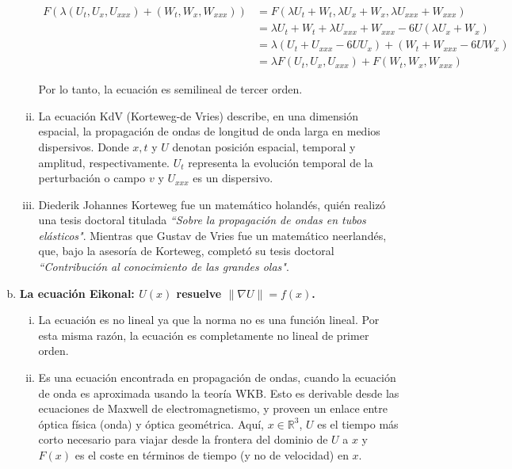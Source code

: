 \documentclass[fleqn]{article}
\newcommand{\real}{\mathbb{R}}
\begin{document}
\begin{enumerate}[(a)]
\begin{enumerate}[(i)]
			\begin{align*}
				F(\lambda (U_t, U_x, U_{xxx}) + (W_t, W_x, W_{xxx})) &= F(\lambda U_t + W_t, \lambda U_x + W_x, \lambda U_{xxx} + W_{xxx}) \\
				&= \lambda U_t + W_t + \lambda U_{xxx} + W_{xxx} - 6U(\lambda U_x + W_x) \\
				&= \lambda (U_t + U_{xxx} - 6UU_x) + (W_t + W_{xxx} - 6UW_x) \\
				&= \lambda F(U_t, U_x, U_{xxx}) + F(W_t, W_x, W_{xxx})
			\end{align*}

			Por lo tanto, la ecuación es semilineal de tercer orden.
			
			\item La ecuación KdV (Korteweg-de Vries) describe, en una dimensión espacial, la propagación de ondas de longitud de onda larga en medios dispersivos. Donde $ x, t $ y $ U $ denotan posición espacial, temporal y amplitud, respectivamente. $ U_t $ representa la evolución temporal de la perturbación o campo $ v $ y $ U_{xxx} $ es un dispersivo.
			
			\item Diederik Johannes Korteweg fue un matemático holandés, quién realizó una tesis doctoral titulada \textit{``Sobre la propagación de ondas en tubos elásticos"}. Mientras que Gustav de Vries fue un matemático neerlandés, que, bajo la asesoría de Korteweg, completó su tesis doctoral \textit{``Contribución al conocimiento de las grandes olas"}.
		\end{enumerate}

		\item \textbf{La ecuación Eikonal: $ U(x) $ resuelve $ \lVert \nabla U \rVert = f(x) $.}
		
		\begin{enumerate}[(i)]
			\item La ecuación es no lineal ya que la norma no es una función lineal. Por esta misma razón, la ecuación es completamente no lineal de primer orden.
			
			\item Es una ecuación encontrada en propagación de ondas, cuando la ecuación de onda es aproximada usando la teoría WKB. Esto es derivable desde las ecuaciones de Maxwell de electromagnetismo, y proveen un enlace entre óptica física (onda) y óptica geométrica. Aquí, $ x \in \real^3 $, $ U $ es el tiempo más corto necesario para viajar desde la frontera del dominio de $ U $ a $ x $ y $ F(x) $ es el coste en términos de tiempo (y no de velocidad) en $ x $.
		\end{enumerate}


\end{enumerate}
\end{document}
